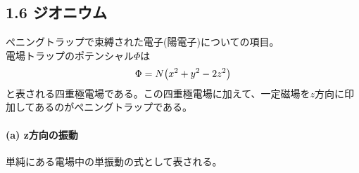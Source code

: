 \documentclass[11pt,a4paper]{jsarticle}
\begin{document}
\subsection*{1.6 ジオニウム}
ぺニングトラップで束縛された電子(陽電子)についての項目。\\
電場トラップのポテンシャル$\Phi$は
\begin{equation}
  \Phi = N \bigl(x^2 + y^2 -2z^2 \bigr)\\
\end{equation}
と表される四重極電場である。この四重極電場に加えて、一定磁場を$z$方向に印加してあるのがぺニングトラップである。
\paragraph{(a) z方向の振動\\}
単純にある電場中の単振動の式として表される。
\end{document}
